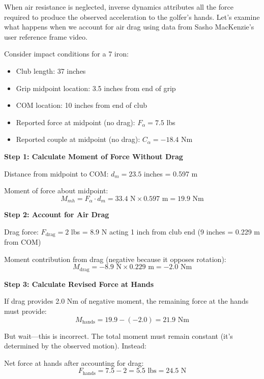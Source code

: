 \documentclass[11pt,a4paper]{article}
\theoremstyle{definition}
\theoremstyle{plain}
\begin{document}
When air resistance is neglected, inverse dynamics attributes all the force required to produce the observed acceleration to the golfer's hands. Let's examine what happens when we account for air drag using data from Sasho MacKenzie's user reference frame video.

Consider impact conditions for a 7 iron:
\begin{itemize}
    \item Club length: 37 inches
    \item Grip midpoint location: 3.5 inches from end of grip
    \item COM location: 10 inches from end of club
    \item Reported force at midpoint (no drag): $F_\alpha = 7.5$ lbs
    \item Reported couple at midpoint (no drag): $C_\alpha = -18.4$ Nm
\end{itemize}

\textbf{Step 1: Calculate Moment of Force Without Drag}

Distance from midpoint to COM: $d_m = 23.5$ inches = 0.597 m

Moment of force about midpoint:
\begin{equation}
M_{mh} = F_\alpha \cdot d_m = 33.4 \text{ N} \times 0.597 \text{ m} = 19.9 \text{ Nm}
\end{equation}

\textbf{Step 2: Account for Air Drag}

Drag force: $F_{\text{drag}} = 2$ lbs = 8.9 N acting 1 inch from club end (9 inches = 0.229 m from COM)

Moment contribution from drag (negative because it opposes rotation):
\begin{equation}
M_{\text{drag}} = -8.9 \text{ N} \times 0.229 \text{ m} = -2.0 \text{ Nm}
\end{equation}

\textbf{Step 3: Calculate Revised Force at Hands}

If drag provides 2.0 Nm of negative moment, the remaining force at the hands must provide:
\begin{equation}
M_{\text{hands}} = 19.9 - (-2.0) = 21.9 \text{ Nm}
\end{equation}

But wait—this is incorrect. The total moment must remain constant (it's determined by the observed motion). Instead:

Net force at hands after accounting for drag:
\begin{equation}
F_{\text{hands}} = 7.5 - 2 = 5.5 \text{ lbs} = 24.5 \text{ N}
\end{equation}
\end{document}
